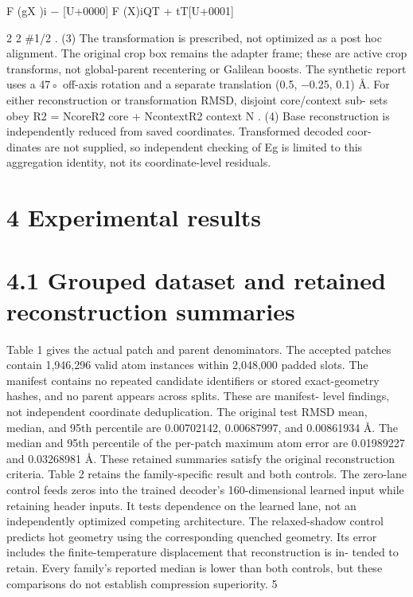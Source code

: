\documentclass[11pt]{article}
\begin{document}
F (gX )i \ensuremath{-}
[U+0000]
F (X)iQT + tT[U+0001]

2
2
\#1/2
. (3)
The transformation is prescribed, not optimized as a post hoc alignment. The original crop
box remains the adapter frame; these are active crop transforms, not global-parent recentering
or Galilean boosts. The synthetic report uses a 47◦ off-axis rotation and a separate translation
(0.5, \ensuremath{-}0.25, 0.1) Å. For either reconstruction or transformation RMSD, disjoint core/context sub-
sets obey
R2 = NcoreR2
core + NcontextR2
context
N . (4)
Base reconstruction is independently reduced from saved coordinates. Transformed decoded coor-
dinates are not supplied, so independent checking of Eg is limited to this aggregation identity, not
its coordinate-level residuals.

\section*{4 Experimental results}


\section*{4.1 Grouped dataset and retained reconstruction summaries}

Table 1 gives the actual patch and parent denominators. The accepted patches contain 1,946,296
valid atom instances within 2,048,000 padded slots. The manifest contains no repeated candidate
identifiers or stored exact-geometry hashes, and no parent appears across splits. These are manifest-
level findings, not independent coordinate deduplication.
The original test RMSD mean, median, and 95th percentile are 0.00702142, 0.00687997, and
0.00861934 Å. The median and 95th percentile of the per-patch maximum atom error are 0.01989227
and 0.03268981 Å. These retained summaries satisfy the original reconstruction criteria. Table 2
retains the family-specific result and both controls.
The zero-lane control feeds zeros into the trained decoder’s 160-dimensional learned input while
retaining header inputs. It tests dependence on the learned lane, not an independently optimized
competing architecture. The relaxed-shadow control predicts hot geometry using the corresponding
quenched geometry. Its error includes the finite-temperature displacement that reconstruction is in-
tended to retain. Every family’s reported median is lower than both controls, but these comparisons
do not establish compression superiority.
5
\end{document}
